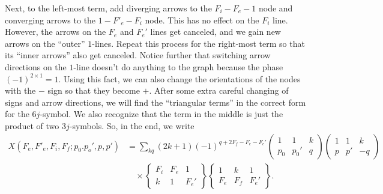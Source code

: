 \documentclass[11pt]{article}
\newcommand{\tj}[6]{ \begin{pmatrix}
		#1 & #2 & #3 \\
		#4 & #5 & #6 
\end{pmatrix}}
\newcommand{\Gj}[6]{ \begin{Bmatrix}
		#1 & #2 & #3 \\
		#4 & #5 & #6 
\end{Bmatrix}}
\begin{document}
\begin{appendices}
\begin{figure}[!htb]
	\caption{}
	\label{fig:X4}
\end{figure}  
Next, to the left-most term, add diverging arrows to the $F_i-F_e-1$ node and converging arrows to the $1-F'_e-F_i$ node. This has no effect on the $F_i$ line. However, the arrows on the $F_e$ and $F_e'$ lines get canceled, and we gain new arrows on the ``outer'' $1$-lines. Repeat this process for the right-most term so that its ``inner arrows''  also get canceled. Notice further that switching arrow directions on the $1$-line doesn't do anything to the graph because the phase $(-1)^{2\times 1} = 1$. Using this fact, we can also change the orientations of the nodes with the $-$ sign so that they become $+$. After some extra careful changing of signs and arrow directions, we will find the ``triangular terms'' in the correct form for the $6j$-symbol. We also recognize that the term in the middle is just the product of two $3j$-symbols. So, in the end, we write
\begin{align*}
X(F_e,F'_e,F_i,F_f;p_0.p_o',p,p') &= \sum_{kq} (2k+1) (-1)^{q + 2F_f - F_e - F_e'}\tj{1}{1}{k}{p_0}{p_0'}{q}\tj{1}{1}{k}{p}{p'}{-q}  \\
&\quad\times \Gj{F_i}{F_e}{1}{k}{1}{F_e'} \Gj{1}{k}{1}{F_e}{F_f}{F_e'}.
\end{align*}


\end{appendices}
\end{document}
